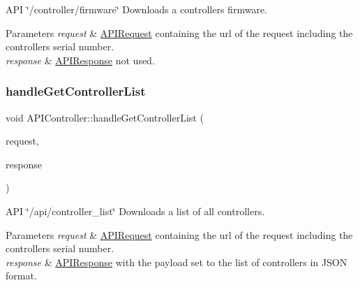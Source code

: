 A\+PI \char`\"{}/controller/firmware\char`\"{} Downloads a controller\textquotesingle{}s firmware. 
\begin{DoxyParams}{Parameters}
{\em request} & \hyperlink{class_a_p_i_request}{A\+P\+I\+Request} containing the url of the request including the controller\textquotesingle{}s serial number. \\
\hline
{\em response} & \hyperlink{class_a_p_i_response}{A\+P\+I\+Response} not used. \\
\hline
\end{DoxyParams}
\mbox{\label{class_a_p_i_controller_ad37a3ecaf99e3b7c43ecb4ec4873fea9}} 
\subsubsection{\texorpdfstring{handle\+Get\+Controller\+List}{handleGetControllerList}}
{\footnotesize\ttfamily void A\+P\+I\+Controller\+::handle\+Get\+Controller\+List (\begin{DoxyParamCaption}\item[{const \hyperlink{class_a_p_i_request}{A\+P\+I\+Request} \&}]{request,  }\item[{\hyperlink{class_a_p_i_response}{A\+P\+I\+Response} $\ast$}]{response }\end{DoxyParamCaption})\hspace{0.3cm}{\ttfamily [slot]}}

A\+PI \char`\"{}/api/controller\+\_\+list\char`\"{} Downloads a list of all controllers. 
\begin{DoxyParams}{Parameters}
{\em request} & \hyperlink{class_a_p_i_request}{A\+P\+I\+Request} containing the url of the request including the controller\textquotesingle{}s serial number. \\
\hline
{\em response} & \hyperlink{class_a_p_i_response}{A\+P\+I\+Response} with the payload set to the list of controllers in J\+S\+ON format. \\
\hline
\end{DoxyParams}
\mbox{\label{class_a_p_i_controller_a20ce823aeb786d2af26fde41c2dc74a1}} 
